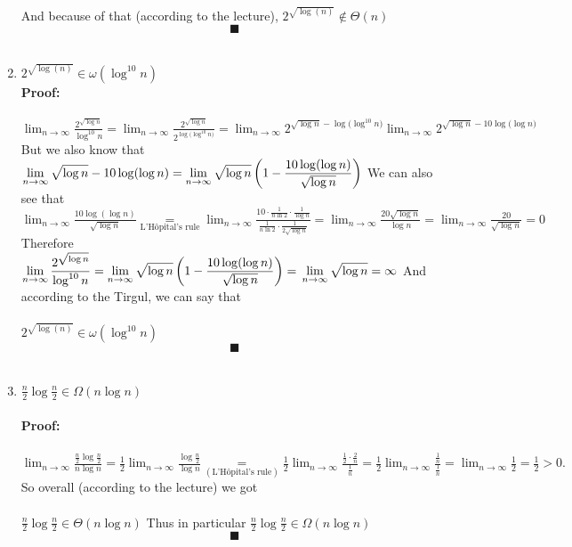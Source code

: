 \documentclass{article}
\newcommand{\dlim}{\displaystyle\lim_{n\to\infty}}
\begin{document}
\begin{enumerate}
    And because of that (according to the lecture), $2^{\sqrt{\log(n)}}\notin\Theta(n)$\\
    $$\blacksquare$$
    \\
    \item $2^{\sqrt{\log(n)}}\in\omega\left(\log^{10}{n}\right)$\\
    \textbf{Proof:}\\
    \\
    $\displaystyle\lim_{n\to\infty}{\frac{2^{\sqrt{\log{n}}}}{\log^{10}{n}}}=\displaystyle\lim_{n\to\infty}
    {\frac{2^{\sqrt{\log{n}}}}
    {2^{\log({\log^{10}{n})}}}}=\displaystyle\lim_{n\to\infty
    }{2^{\sqrt{\log{n}}-\log({\log^{10}{n})}}}
    \displaystyle\lim_{n\to\infty
    }{2^{\sqrt{\log{n}}-10\log({\log{n})}}}$\\
    But we also know that $\displaystyle\lim_{n\to\infty}{\sqrt{\log{n}}-10\log(\log{n})}
    =\displaystyle\lim_{n\to\infty}{\sqrt{\log{n}}\left(1-\frac{10\log(\log{n})}{\sqrt{\log{n}}}\right)}\\$
    We can also see that $\displaystyle\lim_{n\to\infty}{\frac{10\log(\log{n})}{\sqrt{\log{n}}}}
    \underset{\text{L'Hôpital's rule}}{=}\displaystyle\lim_{n\to\infty}
    {\displaystyle\frac{10\cdot\frac{1}{n\ln{2}}\cdot\frac{1}{\log{n}}}{\frac{1}{n\ln{2}}\cdot\frac{1}{2\sqrt{\log{n}}}}}=
    \dlim{\frac{20\sqrt{\log{n}}}{\log{n}}}=\dlim{\frac{20}{\sqrt{\log{n}}}}=0$\\
    Therefore $\displaystyle\lim_{n\to\infty}{\frac{2^{\sqrt{\log{n}}}}{\log^{10}{n}}}=\displaystyle\lim_{n\to\infty}{{\sqrt{\log{n}}\left(1-\frac{10\log(\log{n})}{\sqrt{\log{n}}}\right)}}=\\\\
    \dlim{\sqrt{\log{n}}}=\infty$ And according to the Tirgul, we can say that\\\\ $2^{\sqrt{\log(n)}}\in\omega\left(\log^{10}{n}\right)$\\
    $$\blacksquare$$
    \\
    \item $\frac{n}{2}\log{\frac{n}{2}}\in\Omega\left(n\log{n}\right)$\\
    \\
    \textbf{Proof:}\\
    \\
    $\displaystyle\lim_{n\to\infty}{\frac{\frac{n}{2}\log{\frac{n}{2}}}{n\log{n}}}=\frac{1}{2}\displaystyle\lim_{n\to\infty}{\frac{\log{\frac{n}{2}}}{\log{n}}}\underset{(\text{L'Hôpital's rule})}{=}\frac{1}{2}\displaystyle\lim_{n\to\infty}{\frac{\frac{1}{2}\cdot\frac{2}{n}}{\frac{1}{n}}}=\frac{1}{2}\displaystyle\lim_{n\to\infty}{\frac{\frac{1}{n}}{\frac{1}{n}}}=\displaystyle\lim_{n\to\infty}{\frac{1}{2}}=\frac{1}{2}>0.$ So overall (according to the lecture) we got\\\\
    $\frac{n}{2}\log{\frac{n}{2}}\in\Theta\left(n\log{n}\right)$ Thus in particular $\frac{n}{2}\log{\frac{n}{2}}\in\Omega\left(n\log{n}\right)$
    $$\blacksquare$$
\end{enumerate}
\end{document}
